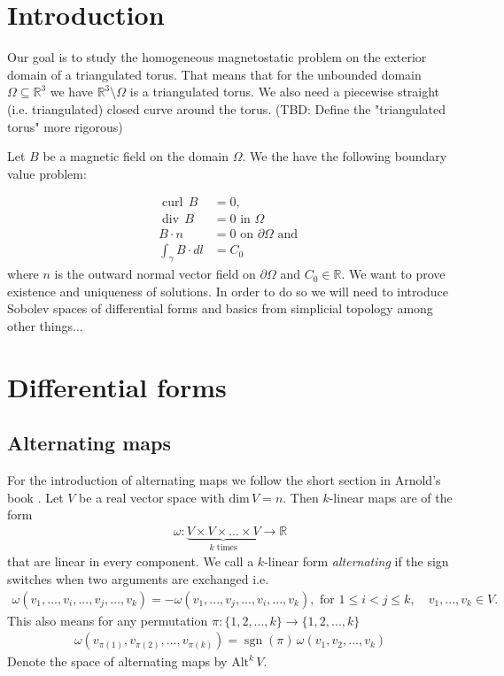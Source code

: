 \documentclass[12pt,a4paper]{article}
\numberwithin{equation}{subsection}
\numberwithin{lemma}{subsection}
\theoremstyle{definition}
\DeclareMathOperator{\curl}{curl}
\DeclareMathOperator{\diver}{div}
\DeclareMathOperator{\sgn}{sgn}
\newcommand{\real}{\mathbb{R}}
\begin{document}
\section{Introduction}
Our goal is to study the homogeneous magnetostatic problem on the exterior 
domain of a triangulated torus. That means 
that for the unbounded domain  $\Omega \subseteq \real^3$ we have
$\real^3 \setminus \Omega$ is a triangulated torus. We also need a 
piecewise straight (i.e. triangulated) closed curve around the torus.
{\color{red} (TBD: Define the "triangulated torus" more rigorous)}

Let $B$ be a magnetic field on the domain $\Omega$.
We the have the following boundary value problem:

\begin{align}
    \curl \, B &= 0, \\ 
    \diver \, B  &= 0 \text{ in } \Omega \\
    B \cdot n &= 0 \text{ on } \partial \Omega \text{ and }\\
    \int_\gamma B \cdot dl &= C_0
\end{align}
where $n$ is the outward normal vector field on $\partial \Omega$ and 
$C_0 \in \real$. We want to prove existence and uniqueness of 
solutions. In order to do so we will need to introduce Sobolev spaces of 
differential forms and basics from
simplicial topology {\color{red} among other things...}

\section{Differential forms}


\subsection{Alternating maps} \label{sec:alternating_maps}

For the introduction of alternating maps we follow
the short section in Arnold's book
\cite[Sec. 6.1.]{arnold}.
Let $V$ be a real vector space with $\text{dim}\,V = n$.
Then $k$-linear maps are of the form
\begin{align*}
    \omega: \underbrace{V \times V \times ... \times V}_{k \text{ times}}
    \rightarrow \real
\end{align*}
that are linear in every component. We call a $k$-linear form 
\textit{alternating} if the sign switches when two arguments are exchanged i.e.
\begin{align*}
    \omega(v_1,...,v_i,...,v_j,...,v_k)
    = - \omega(v_1,...,v_j,...,v_i,...,v_k), \text{ for } 1\leq i < j \leq k,
    \quad v_1,...,v_k \in V.
\end{align*}
This also means for any permutation 
$\pi: \{1,2,...,k\} \rightarrow \{1,2,...,k\}$
\begin{align*}
    \omega(v_{\pi(1)},v_{\pi(2)},...,v_{\pi(k)})
    = \sgn(\pi)\, \omega(v_1, v_2,..., v_k)
\end{align*}
Denote the space of alternating maps by $\text{Alt}^k\,V$.
\end{document}
